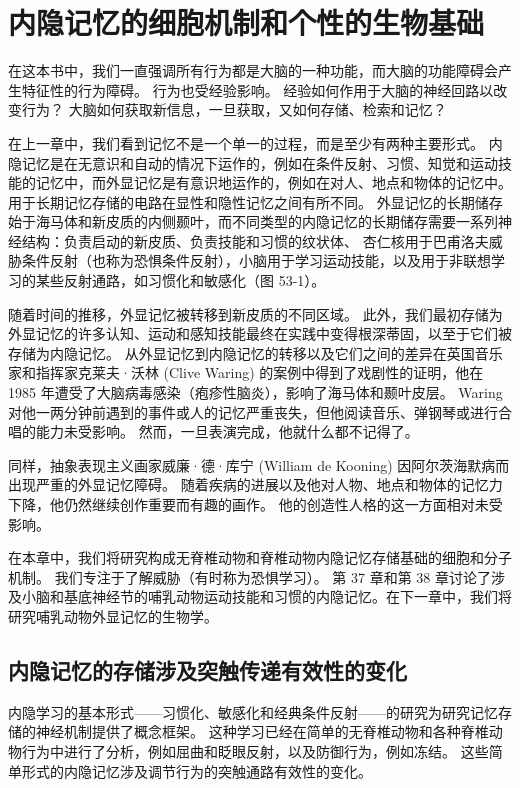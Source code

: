 \chapter{内隐记忆的细胞机制和个性的生物基础} \label{chap:chap53}

在这本书中，我们一直强调所有行为都是大脑的一种功能，而大脑的功能障碍会产生特征性的行为障碍。 行为也受经验影响。 经验如何作用于大脑的神经回路以改变行为？ 大脑如何获取新信息，一旦获取，又如何存储、检索和记忆？

在上一章中，我们看到记忆不是一个单一的过程，而是至少有两种主要形式。 内隐记忆是在无意识和自动的情况下运作的，例如在条件反射、习惯、知觉和运动技能的记忆中，而外显记忆是有意识地运作的，例如在对人、地点和物体的记忆中。 用于长期记忆存储的电路在显性和隐性记忆之间有所不同。 外显记忆的长期储存始于海马体和新皮质的内侧颞叶，而不同类型的内隐记忆的长期储存需要一系列神经结构：负责启动的新皮质、负责技能和习惯的纹状体、 杏仁核用于巴甫洛夫威胁条件反射（也称为恐惧条件反射），小脑用于学习运动技能，以及用于非联想学习的某些反射通路，如习惯化和敏感化（图 53-1）。

随着时间的推移，外显记忆被转移到新皮质的不同区域。 此外，我们最初存储为外显记忆的许多认知、运动和感知技能最终在实践中变得根深蒂固，以至于它们被存储为内隐记忆。 从外显记忆到内隐记忆的转移以及它们之间的差异在英国音乐家和指挥家克莱夫·沃林 (Clive Waring) 的案例中得到了戏剧性的证明，他在 1985 年遭受了大脑病毒感染（疱疹性脑炎），影响了海马体和颞叶皮层。 Waring 对他一两分钟前遇到的事件或人的记忆严重丧失，但他阅读音乐、弹钢琴或进行合唱的能力未受影响。 然而，一旦表演完成，他就什么都不记得了。

同样，抽象表现主义画家威廉·德·库宁 (William de Kooning) 因阿尔茨海默病而出现严重的外显记忆障碍。 随着疾病的进展以及他对人物、地点和物体的记忆力下降，他仍然继续创作重要而有趣的画作。 他的创造性人格的这一方面相对未受影响。

在本章中，我们将研究构成无脊椎动物和脊椎动物内隐记忆存储基础的细胞和分子机制。 我们专注于了解威胁（有时称为恐惧学习）。 第 37 章和第 38 章讨论了涉及小脑和基底神经节的哺乳动物运动技能和习惯的内隐记忆。在下一章中，我们将研究哺乳动物外显记忆的生物学。


\section{内隐记忆的存储涉及突触传递有效性的变化}
内隐学习的基本形式——习惯化、敏感化和经典条件反射——的研究为研究记忆存储的神经机制提供了概念框架。 这种学习已经在简单的无脊椎动物和各种脊椎动物行为中进行了分析，例如屈曲和眨眼反射，以及防御行为，例如冻结。 这些简单形式的内隐记忆涉及调节行为的突触通路有效性的变化。

